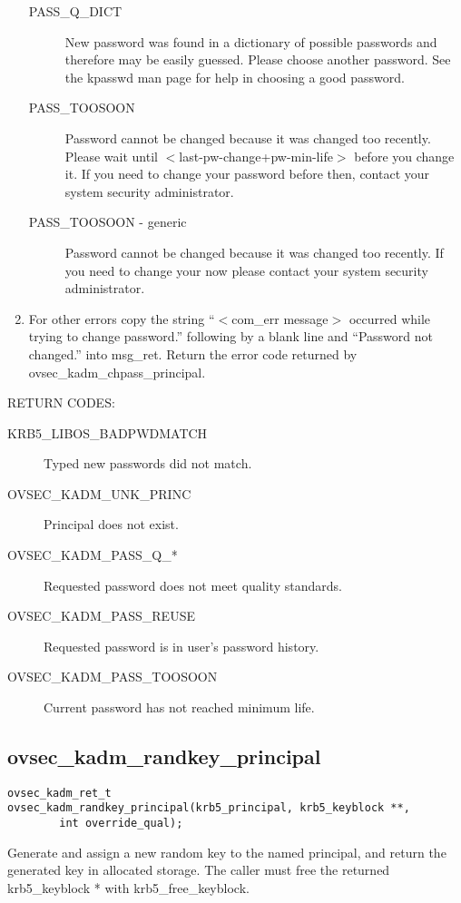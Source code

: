 \begin{enumerate}
\begin{description}
\item[PASS_Q_DICT] 
New password was found in a dictionary of possible passwords and
therefore may be easily guessed.  Please choose another password. See
the kpasswd man page for help in choosing a good password.

\item[PASS_TOOSOON]
Password cannot be changed because it was changed too recently. Please
wait until $<$last-pw-change+pw-min-life$>$ before you change it. If you
need to change your password before then, contact your system
security administrator.

\item[PASS_TOOSOON - generic]
Password cannot be changed because it was changed too recently. If you
need to change your now please contact your system security
administrator.
\end{description}

\item For other errors copy the string ``$<$com_err message$>$ occurred while trying to change password.'' following by a blank line and ``Password not changed.'' into msg_ret. Return the error code returned by ovsec_kadm_chpass_principal.
\end{enumerate}


RETURN CODES:

\begin{description}
\item[KRB5_LIBOS_BADPWDMATCH] Typed new passwords did not match.
\item[OVSEC_KADM_UNK_PRINC] Principal does not exist.
\item[OVSEC_KADM_PASS_Q_*] Requested password does not meet quality
standards. 
\item[OVSEC_KADM_PASS_REUSE] Requested password is in user's
password history. 
\item[OVSEC_KADM_PASS_TOOSOON] Current password has not reached minimum
life. 
\end{description}


\subsection{ovsec_kadm_randkey_principal}

\begin{verbatim}
ovsec_kadm_ret_t
ovsec_kadm_randkey_principal(krb5_principal, krb5_keyblock **,
		int override_qual);
\end{verbatim}

Generate and assign a new random key to the named principal, and
return the generated key in allocated storage.  The caller must free
the returned krb5_keyblock * with krb5_free_keyblock.

